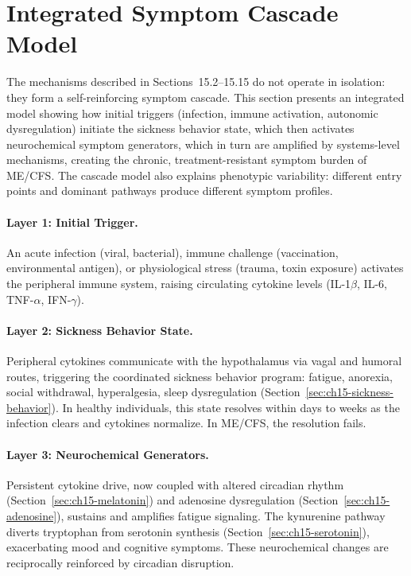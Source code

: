 \section{Integrated Symptom Cascade Model}
\label{sec:ch15-integrated-cascade}

The mechanisms described in Sections~15.2--15.15 do not operate in isolation: they form a self-reinforcing symptom cascade. This section presents an integrated model showing how initial triggers (infection, immune activation, autonomic dysregulation) initiate the sickness behavior state, which then activates neurochemical symptom generators, which in turn are amplified by systems-level mechanisms, creating the chronic, treatment-resistant symptom burden of ME/CFS. The cascade model also explains phenotypic variability: different entry points and dominant pathways produce different symptom profiles.

\paragraph{Layer 1: Initial Trigger.} An acute infection (viral, bacterial), immune challenge (vaccination, environmental antigen), or physiological stress (trauma, toxin exposure) activates the peripheral immune system, raising circulating cytokine levels (IL-1$\beta$, IL-6, TNF-$\alpha$, IFN-$\gamma$).

\paragraph{Layer 2: Sickness Behavior State.} Peripheral cytokines communicate with the hypothalamus via vagal and humoral routes, triggering the coordinated sickness behavior program: fatigue, anorexia, social withdrawal, hyperalgesia, sleep dysregulation (Section~\ref{sec:ch15-sickness-behavior}). In healthy individuals, this state resolves within days to weeks as the infection clears and cytokines normalize. In ME/CFS, the resolution fails.

\paragraph{Layer 3: Neurochemical Generators.} Persistent cytokine drive, now coupled with altered circadian rhythm (Section~\ref{sec:ch15-melatonin}) and adenosine dysregulation (Section~\ref{sec:ch15-adenosine}), sustains and amplifies fatigue signaling. The kynurenine pathway diverts tryptophan from serotonin synthesis (Section~\ref{sec:ch15-serotonin}), exacerbating mood and cognitive symptoms. These neurochemical changes are reciprocally reinforced by circadian disruption.

